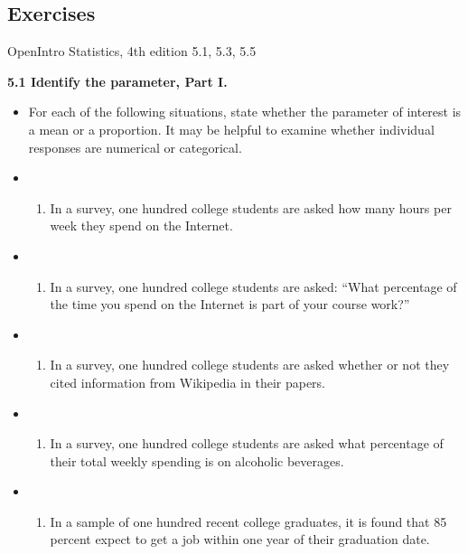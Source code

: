 \documentclass[]{book}
\providecommand{\tightlist}{%
  \setlength{\itemsep}{0pt}\setlength{\parskip}{0pt}}
\begin{document}
\hypertarget{exercises}{%
\subsection*{Exercises}\label{exercises}}

OpenIntro Statistics, 4th edition
5.1, 5.3, 5.5

\textbf{5.1 Identify the parameter, Part I.}

\begin{itemize}
\item
  For each of the following situations, state whether the parameter of interest is a mean or a proportion. It may be helpful to examine whether individual responses are numerical or categorical.
\item
  \begin{enumerate}
  \def\labelenumi{(\alph{enumi})}
  \tightlist
  \item
    In a survey, one hundred college students are asked how many hours per week they spend on the Internet.
  \end{enumerate}
\item
  \begin{enumerate}
  \def\labelenumi{(\alph{enumi})}
  \setcounter{enumi}{1}
  \tightlist
  \item
    In a survey, one hundred college students are asked: ``What percentage of the time you spend on the Internet is part of your course work?''
  \end{enumerate}
\item
  \begin{enumerate}
  \def\labelenumi{(\alph{enumi})}
  \setcounter{enumi}{2}
  \tightlist
  \item
    In a survey, one hundred college students are asked whether or not they cited information from Wikipedia in their papers.
  \end{enumerate}
\item
  \begin{enumerate}
  \def\labelenumi{(\alph{enumi})}
  \setcounter{enumi}{3}
  \tightlist
  \item
    In a survey, one hundred college students are asked what percentage of their total weekly spending is on alcoholic beverages.
  \end{enumerate}
\item
  \begin{enumerate}
  \def\labelenumi{(\alph{enumi})}
  \setcounter{enumi}{4}
  \tightlist
  \item
    In a sample of one hundred recent college graduates, it is found that 85 percent expect to get a job within one year of their graduation date.
  \end{enumerate}
\end{itemize}
\end{document}
